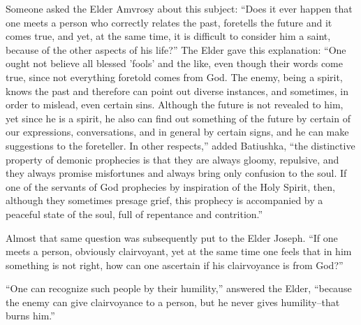 Someone asked the Elder Amvrosy about this subject: ``Does it ever happen that one meets a person who correctly relates the past, foretells the future and it comes true, and yet, at the same time, it is difficult to consider him a saint, because of the other aspects of his life?'' The Elder gave this explanation: ``One ought not believe all blessed 'fools' and the like, even though their words come true, since not everything foretold comes from God. The enemy, being a spirit, knows the past and therefore can point out diverse instances, and sometimes, in order to mislead, even certain sins. Although the future is not revealed to him, yet since he is a spirit, he also can find out something of the future by certain of our expressions, conversations, and in general by certain signs, and he can make suggestions to the foreteller. In other respects,'' added Batiushka, ``the distinctive property of demonic prophecies is that they are always gloomy, repulsive, and they always promise misfortunes and always bring only confusion to the soul. If one of the servants of God prophecies by inspiration of the Holy Spirit, then, although they sometimes presage grief, this prophecy is accompanied by a peaceful state of the soul, full of repentance and contrition.''

Almost that same question was subsequently put to the Elder Joseph. ``If one meets a person, obviously clairvoyant, yet at the same time one feels that in him something is not right, how can one ascertain if his clairvoyance is from God?''

``One can recognize such people by their humility,'' answered the Elder, ``because the enemy can give clairvoyance to a person, but he never gives humility--that burns him.''
